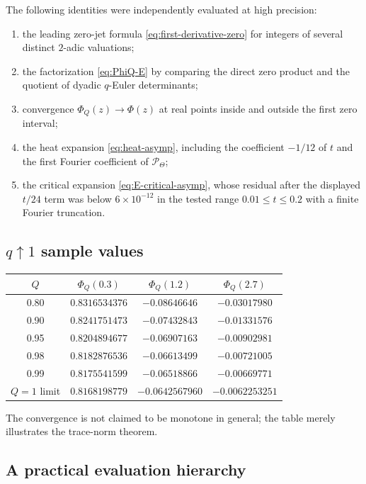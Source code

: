 \documentclass[11pt,oneside]{article}
\numberwithin{equation}{section}
\theoremstyle{plain}
\theoremstyle{definition}
\theoremstyle{remark}
\newcommand{\Pcal}{\mathcal P}
\begin{document}
The following identities were independently evaluated at high precision:
\begin{enumerate}[leftmargin=2em]
\item the leading zero-jet formula \cref{eq:first-derivative-zero} for integers of several distinct $2$-adic valuations;
\item the factorization \cref{eq:PhiQ-E} by comparing the direct zero product and the quotient of dyadic $q$-Euler determinants;
\item convergence $\Phi_Q(z)\to\Phi(z)$ at real points inside and outside the first zero interval;
\item the heat expansion \cref{eq:heat-asymp}, including the coefficient $-1/12$ of $t$ and the first Fourier coefficient of $\Pcal_\Theta$;
\item the critical expansion \cref{eq:E-critical-asymp}, whose residual after the displayed $t/24$ term was below $6\times10^{-12}$ in the tested range $0.01\le t\le0.2$ with a finite Fourier truncation.
\end{enumerate}

\subsection{$q\uparrow1$ sample values}

\begin{center}
\small
\begin{tabular}{@{}c|ccc@{}}
\toprule
$Q$ & $\Phi_Q(0.3)$ & $\Phi_Q(1.2)$ & $\Phi_Q(2.7)$\\
\midrule
0.80 & $0.8316534376$ & $-0.08646646$ & $-0.03017980$\\
0.90 & $0.8241751473$ & $-0.07432843$ & $-0.01331576$\\
0.95 & $0.8204894677$ & $-0.06907163$ & $-0.00902981$\\
0.98 & $0.8182876536$ & $-0.06613499$ & $-0.00721005$\\
0.99 & $0.8175541599$ & $-0.06518866$ & $-0.00669771$\\
\midrule
$Q=1$ limit & $0.8168198779$ & $-0.0642567960$ & $-0.0062253251$\\
\bottomrule
\end{tabular}
\end{center}

The convergence is not claimed to be monotone in general; the table merely illustrates the trace-norm theorem.

\subsection{A practical evaluation hierarchy}
\end{document}

